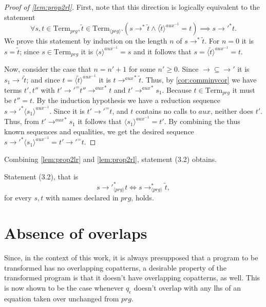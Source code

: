 \begin{proof}[Proof of \autoref{lem:prop2rl}]

First, note that this direction is logically equivalent to the statement
\[
\forall s, t \in \textrm{Term}_{prg}, \widetilde{t} \in \textrm{Term}_{\langle prg \rangle}. (s \longrightarrow^* \widetilde{t} \land \langle \widetilde{t} \rangle^{aux^{-1}} = t) \implies s {\longrightarrow'}^* t.
\]
We prove this statement by induction on the length $n$ of $s \longrightarrow^* \widetilde{t}$. For $n = 0$ it is $s = \widetilde{t}$; since $s \in \textrm{Term}_{prg}$ it is $\langle s \rangle^{aux^{-1}} = s$ and it follows that $s = \langle \widetilde{t} \rangle^{aux^{-1}} = t$. 

Now, consider the case that $n = n'+1$ for some $n' \geq 0$. Since $\longrightarrow \subseteq \longrightarrow'$ it is $s_1 \longrightarrow' \widetilde{t}$; and since $t = \langle \widetilde{t} \rangle^{aux^{-1}}$ it is $t {\longrightarrow^{aux}}^* \widetilde{t}$. Thus, by \autoref{cor:comminvcor} we have terms $t', t''$ with $t' {\longrightarrow'}^= t'' {\longrightarrow^{aux}}^* t$ and $t' {\longrightarrow^{aux}}^* s_1$. Because $t \in \textrm{Term}_{prg}$ it must be $t'' = t$. By the induction hypothesis we have a reduction sequence $s {\longrightarrow'}^* \langle s_1 \rangle^{aux^{-1}}$. Since it is $t' {\longrightarrow'}^= t$, and $t$ contains no calls to $aux$, neither does $t'$. Thus, from $t' {\longrightarrow^{aux}}^* s_1$ it follows that $\langle s_1 \rangle^{aux^{-1}} = t'$. By combining the thus known sequences and equalities, we get the desired sequence $s {\longrightarrow'}^* \langle s_1 \rangle^{aux^{-1}} = t' {\longrightarrow'}^= t$.

\end{proof}

Combining \autoref{lem:prop2lr} and \autoref{lem:prop2rl}, statement (3.2) obtains.
\begin{proposition}
\label{prop:bisim2}
Statement (3.2), that is
\[
s {\longrightarrow'}_{\langle prg \rangle}^* t \iff s \longrightarrow^*_{\langle prg \rangle} \widetilde{t},
\]
for every $s, t$ with names declared in $prg$, holds.
\end{proposition}

\section{Absence of overlaps}
\label{sec:extrovl}

Since, in the context of this work, it is always presupposed that a program to be transformed has no overlapping copatterns, a desirable property of the transformed program is that it doesn't have overlapping copatterns, as well. This is now shown to be the case whenever $q_\epsilon$ doesn't overlap with any lhs of an equation taken over unchanged from $prg$.

